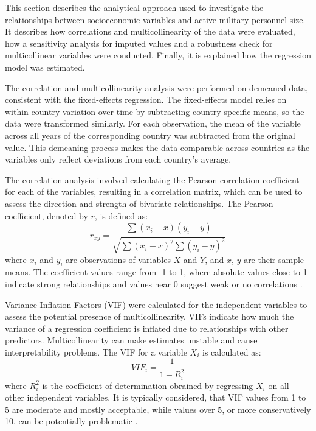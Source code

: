 This section describes the analytical approach used to investigate the relationships between 
socioeconomic variables and active military personnel size.
It describes how correlations and multicollinearity of the data were evaluated, 
how a sensitivity analysis for imputed values and a robustness check for multicollinear 
variables were conducted. Finally, it is explained how the regression model was estimated.

The correlation and multicollinearity analysis were performed on demeaned data, consistent 
with the fixed-effects regression. The fixed-effects model relies on within-country variation 
over time by subtracting country-specific means, so the data were transformed similarly. For 
each observation, the mean of the variable across all years of the corresponding country was 
subtracted from the original value. This demeaning process makes the data comparable across 
countries as the variables only reflect deviations from each country's average. 

The correlation analysis involved calculating the Pearson correlation coefficient for each 
of the variables, resulting in a correlation matrix, which can be used to assess the 
direction and strength of bivariate relationships. 
The Pearson coefficient, denoted by $r$, is 
defined as:
\begin{equation*}
    r_{xy} = \frac{\sum(x_i - \bar{x})(y_i - \bar{y})}{\sqrt{\sum(x_i - \bar{x})^2 \sum(y_i - \bar{y})^2}}
\end{equation*}
where $x_i$ and $y_i$ are observations of variables $X$ and $Y$, and $\bar{x}$, $\bar{y}$ are their 
sample means. The coefficient values range from -1 to 1, where absolute values close to 1 indicate 
strong relationships and values near 0 suggest weak or no correlations \parencite{cohen_bivariate_2003}. 

Variance Inflation Factors (VIF) were calculated for the independent variables to 
assess the potential presence of multicollinearity. VIFs indicate how much the variance
of a regression coefficient is inflated due to relationships with other predictors. Multicollinearity 
can make estimates unstable and cause interpretability problems. The VIF for 
a variable $X_i$ is calculated as:
\begin{equation*}
    VIF_i = \frac{1}{1-R^2_i}
\end{equation*}
where $R^2_i$ is the coefficient of determination obrained by regressing $X_i$ on all other independent
variables. It is typically considered, that VIF values from 1 to 5 are
moderate and mostly acceptable, while values over 5, or more conservatively 10, 
can be potentially problematic \parencite{obrien_caution_2007}.

